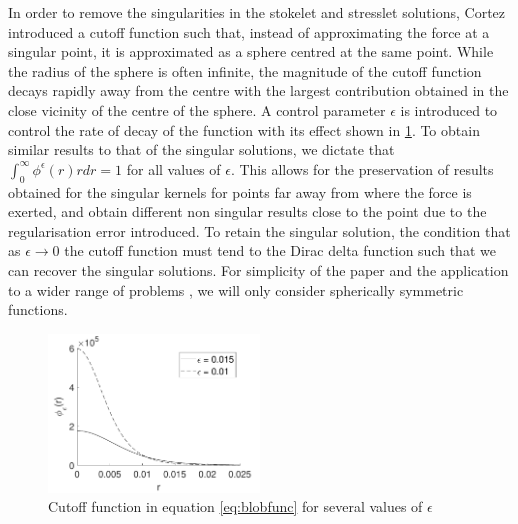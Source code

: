 In order to remove the singularities in the stokelet and stresslet solutions, Cortez \cite{Cortez2001} introduced a cutoff function such that, instead of approximating the force at a singular point, it is approximated as a sphere centred at the same point. While the radius of the sphere is often infinite, the magnitude of the cutoff function decays rapidly away from the centre with the largest contribution obtained in the close vicinity of the centre of the sphere. A  control parameter $\epsilon$ is introduced to control the rate of decay of the function with its effect shown in \cref{fig:blobfunc}. To obtain similar results to that of the singular solutions, we dictate that $\int_0^\infty \phi^\epsilon(r) r dr=1$ for all values of $\epsilon$. This allows for the preservation of results obtained for the singular kernels for points far away from where the force is exerted, and obtain different non singular results close to the point due to the regularisation error introduced. To retain the singular solution, the condition that as $\epsilon \to 0$ the cutoff function must tend to the Dirac delta function such that we can recover the singular solutions. For simplicity of the paper and the application to a wider range of problems \cite{Olson2013ModelingFormulation}, we will only consider spherically symmetric functions.

\begin{figure}
    \centering
    \includegraphics[width=0.5\textwidth]{Images/BlobFunc.pdf}
    \caption{Cutoff function in equation \ref{eq:blobfunc} for several values of $\epsilon$}
    \label{fig:blobfunc}
\end{figure}

